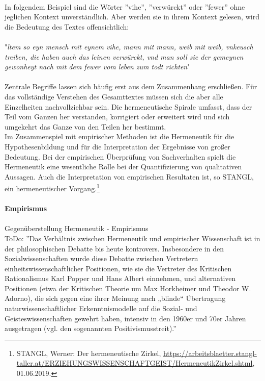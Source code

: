 \documentclass[12pt,a4paper]{article}
\begin{document}
\\
In folgendem Beispiel sind die Wörter ''vihe'', ''verwürckt'' oder ''fewer'' ohne jeglichen Kontext unverständlich. Aber werden sie in ihrem Kontext gelesen, wird die Bedeutung des Textes offensichtlich:
\\
\\
"\textit{ltem so eyn mensch mit eynem vihe, mann mit mann, weib mit weib, vnkeusch treiben, die haben auch das leinen verwürckt, vnd man soll sie der gemeynen gewonheyt nach mit dem fewer vom leben zum todt richten}" 
\\
\\
Zentrale Begriffe lassen sich häufig erst aus dem Zusammenhang erschließen. Für das vollständige Verstehen des Gesamttextes müssen sich die aber alle Einzelheiten nachvollziehbar sein. Die hermeneutische Spirale umfasst, dass der Teil vom Ganzen her verstanden, korrigiert oder erweitert wird und sich umgekehrt das Ganze von den Teilen her bestimmt.
\\
Im Zusammenspiel mit empirischer Methoden ist die Hermeneutik für die Hypothesenbildung und für die Interpretation der Ergebnisse von großer Bedeutung. Bei der empirischen Überprüfung von Sachverhalten spielt die Hermeneutik eine wesentliche Rolle bei der Quantifizierung von qualitativen Aussagen. Auch die Interpretation von empirischen Resultaten ist, so STANGL, ein hermeneutischer Vorgang.\footnote{STANGL, Werner: Der hermeneutische Zirkel, \protect\url{https://arbeitsblaetter.stangl-taller.at/ERZIEHUNGSWISSENSCHAFTGEIST/HermeneutikZirkel.shtml}, 01.06.2019.}
\\
\\
\textbf{Empirismus}
\\
\\
Gegenüberstellung Hermeneutik - Empirismus
\\
ToDo:
''Das Verhältnis zwischen Hermeneutik und empirischer Wissenschaft ist in der philosophischen Debatte bis heute kontrovers. Insbesondere in den Sozialwissenschaften wurde diese Debatte zwischen Vertretern einheitswissenschaftlicher Positionen, wie sie die Vertreter des Kritischen Rationalismus Karl Popper und Hans Albert einnehmen, und alternativen Positionen (etwa der Kritischen Theorie um Max Horkheimer und Theodor W. Adorno), die sich gegen eine ihrer Meinung nach „blinde“ Übertragung naturwissenschaftlicher Erkenntnismodelle auf die Sozial- und Geisteswissenschaften gewehrt haben, intensiv in den 1960er und 70er Jahren ausgetragen (vgl. den sogenannten Positivismusstreit).'' 
\end{document}
